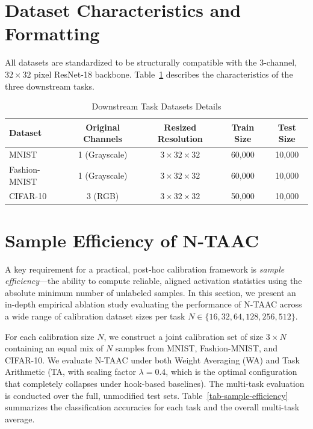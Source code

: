 \documentclass{article}
\theoremstyle{plain}
\theoremstyle{definition}
\theoremstyle{remark}
\begin{document}
\newpage
\section{Dataset Characteristics and Formatting}
\label{appendix-datasets}

All datasets are standardized to be structurally compatible with the 3-channel, $32 \times 32$ pixel ResNet-18 backbone. Table~\ref{tab-dataset-details} describes the characteristics of the three downstream tasks.

\begin{table}[htbp]
\caption{Downstream Task Datasets Details}
\label{tab-dataset-details}
\begin{center}
\begin{small}
\begin{tabular}{lcccc}
\toprule
Dataset & Original Channels & Resized Resolution & Train Size & Test Size \\
\midrule
MNIST & 1 (Grayscale) & $3 \times 32 \times 32$ & 60,000 & 10,000 \\
Fashion-MNIST & 1 (Grayscale) & $3 \times 32 \times 32$ & 60,000 & 10,000 \\
CIFAR-10 & 3 (RGB) & $3 \times 32 \times 32$ & 50,000 & 10,000 \\
\bottomrule
\end{tabular}
\end{small}
\end{center}
\end{table}

\newpage
\section{Sample Efficiency of N-TAAC}
\label{appendix-sample-efficiency}

A key requirement for a practical, post-hoc calibration framework is \textit{sample efficiency}---the ability to compute reliable, aligned activation statistics using the absolute minimum number of unlabeled samples. In this section, we present an in-depth empirical ablation study evaluating the performance of N-TAAC across a wide range of calibration dataset sizes per task $N \in \{16, 32, 64, 128, 256, 512\}$. 

For each calibration size $N$, we construct a joint calibration set of size $3 \times N$ containing an equal mix of $N$ samples from MNIST, Fashion-MNIST, and CIFAR-10. We evaluate N-TAAC under both Weight Averaging (WA) and Task Arithmetic (TA, with scaling factor $\lambda=0.4$, which is the optimal configuration that completely collapses under hook-based baselines). The multi-task evaluation is conducted over the full, unmodified test sets. Table~\ref{tab-sample-efficiency} summarizes the classification accuracies for each task and the overall multi-task average.
\end{document}
